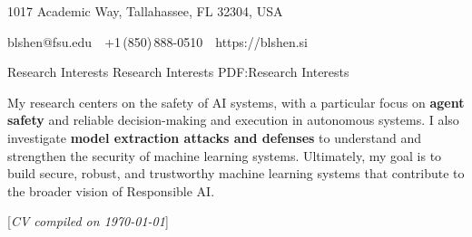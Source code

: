 \documentclass[letterpaper,MMMyyyy,nonstopmode]{simpleresumecv}
\newcommand{\CVAuthor}{Bolin Shen}
\newcommand{\CVNote}{CV compiled on {\today}}
\newcommand{\CVWebpage}{https://blshen.si}
\begin{document}

\Title{\CVAuthor}

\begin{SubTitle}
{1017 Academic Way, Tallahassee, FL 32304, USA}
\par
{blshen@fsu.edu}
\,\SubBulletSymbol\,
+1\,(850)\,888-0510
\,\SubBulletSymbol\,
{\CVWebpage}
\end{SubTitle}

\begin{Body}



\Section
{Research Interests}
{Research Interests}
{PDF:Research Interests}

\Entry
My research centers on the safety of AI systems, with a particular focus on \textbf{agent safety} and reliable decision-making and execution in autonomous systems. I also investigate \textbf{model extraction attacks and defenses} to understand and strengthen the security of machine learning systems. Ultimately, my goal is to build secure, robust, and trustworthy machine learning systems that contribute to the broader vision of Responsible AI.























\end{Body}


\BigGap
\UseNoteFont%
\null\hfill%
[\textit{\CVNote}]
\end{document}
